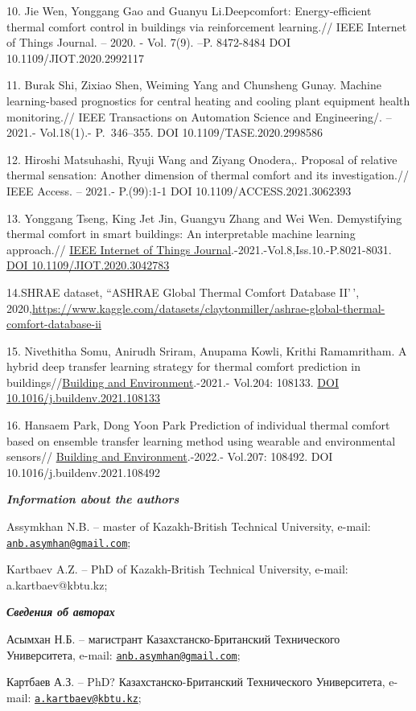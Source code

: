 10. Jie Wen, Yonggang Gao and Guanyu Li.Deepcomfort: Energy-efficient
thermal comfort control in buildings via reinforcement learning.// IEEE
Internet of Things Journal. -- 2020. - Vol. 7(9). --P. 8472-8484 DOI
10.1109/JIOT.2020.2992117

11. Burak Shi, Zixiao Shen, Weiming Yang and Chunsheng Gunay. Machine
learning-based prognostics for central heating and cooling plant
equipment health monitoring.// IEEE Transactions on Automation Science
and Engineering/. -- 2021.- Vol.18(1).- P.~346--355. DOI
10.1109/TASE.2020.2998586

12. Hiroshi Matsuhashi, Ryuji Wang and Ziyang Onodera,. Proposal of
relative thermal sensation: Another dimension of thermal comfort and its
investigation.// IEEE Access. -- 2021.- P.(99):1-1 DOI
10.1109/ACCESS.2021.3062393

13. Yonggang Tseng, King Jet Jin, Guangyu Zhang and Wei Wen.
Demystifying thermal comfort in smart buildings: An interpretable
machine learning approach.//
\href{https://ieeexplore.ieee.org/xpl/RecentIssue.jsp?punumber=6488907}{IEEE
Internet of Things Journal}.-2021.-Vol.8,Iss.10.-P.8021-8031.
\href{https://doi.org/10.1109/JIOT.2020.3042783}{DOI
10.1109/JIOT.2020.3042783}

14.SHRAE dataset, ``ASHRAE Global Thermal Comfort Database II'\,',
2020,\url{https://www.kaggle.com/datasets/claytonmiller/ashrae-global-thermal-comfort-database-ii}

15. Nivethitha Somu, Anirudh Sriram, Anupama Kowli, Krithi Ramamritham.
A hybrid deep transfer learning strategy for thermal comfort prediction
in
buildings//\href{https://www.sciencedirect.com/journal/building-and-environment}{Building
and Environment}.-2021.- Vol.204: 108133.
\href{https://doi.org/10.1016/j.buildenv.2021.108133}{DOI
10.1016/j.buildenv.2021.108133}

16. Hansaem Park, Dong Yoon Park Prediction of individual thermal
comfort based on ensemble transfer learning method using wearable and
environmental sensors//
\href{https://www.sciencedirect.com/journal/building-and-environment}{Building
and Environment}.-2022.- Vol.207: 108492. DOI
10.1016/j.buildenv.2021.108492

\emph{{\bfseries Information about the authors}}

Assymkhan N.B. -- master of Kazakh-British Technical University, e-mail:
\href{mailto:anb.asymhan@gmail.com}{\nolinkurl{anb.asymhan@gmail.com}};

Kartbaev A.Z. -- PhD of Kazakh-British Technical University, e-mail:
a.kartbaev@kbtu.kz;

\emph{{\bfseries Сведения об авторах}}

Асымхан Н.Б. -- магистрант Казахстанско-Британский Технического
Университета, e-mail:
\href{mailto:anb.asymhan@gmail.com}{\nolinkurl{anb.asymhan@gmail.com}};

Картбаев А.З. -- PhD? Казахстанско-Британский Технического Университета,
e-mail:
\href{mailto:a.kartbaev@kbtu.kz}{\nolinkurl{a.kartbaev@kbtu.kz}};

